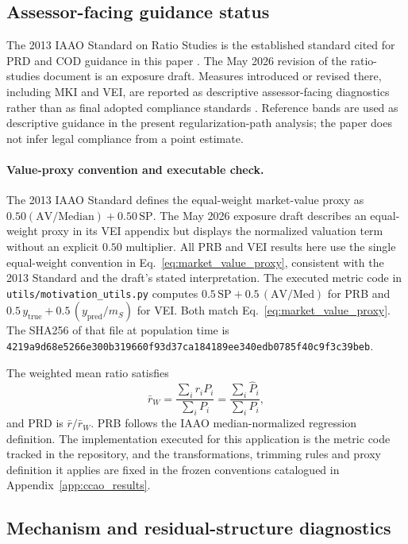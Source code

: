 \documentclass[10pt]{article}
\theoremstyle{definition}
\newcommand{\1}{\mathbf{1}}
\begin{document}
\subsection{Assessor-facing guidance status}

The 2013 IAAO Standard on Ratio Studies is the established standard cited for PRD
and COD guidance in this paper \cite{IAAO2013Ratio}. The May 2026 revision of the
ratio-studies document is an exposure draft. Measures introduced or revised there,
including MKI and VEI, are reported as descriptive assessor-facing diagnostics rather than as
final adopted compliance standards \cite{IAAO2026ExposureRatio}. Reference bands
are used as descriptive guidance in the present
regularization-path analysis; the paper does not
infer legal compliance from a point estimate.

\paragraph{Value-proxy convention and executable check.}
The 2013 IAAO Standard defines the equal-weight market-value proxy as
$0.50(\mathrm{AV}/\mathrm{Median})+0.50\,\mathrm{SP}$.
The May 2026 exposure draft describes an equal-weight proxy in its VEI
appendix but displays the normalized valuation term without an explicit
$0.50$ multiplier. All PRB and VEI results here use the single equal-weight
convention in Eq.~\eqref{eq:market_value_proxy}, consistent with the 2013
Standard and the draft's stated interpretation. The executed metric code in
\texttt{utils/motivation\_utils.py} computes
$0.5\,\mathrm{SP}+0.5\,(\mathrm{AV}/\mathrm{Med})$ for PRB and
$0.5\,y_{\mathrm{true}}+0.5\,(y_{\mathrm{pred}}/m_S)$ for VEI. Both match
Eq.~\eqref{eq:market_value_proxy}. The SHA256 of that file at population time
is \texttt{4219a9d68e5266e300b319660f93d37ca184189ee340edb0785f40c9f3c39beb}.

The weighted mean ratio satisfies
\[
\bar r_W
=
\frac{\sum_i r_iP_i}{\sum_iP_i}
=
\frac{\sum_i\widehat P_i}{\sum_iP_i},
\]
and PRD is $\bar r/\bar r_W$. PRB follows the IAAO median-normalized regression
definition. The implementation executed for this application is the metric code tracked in the
repository, and the transformations, trimming rules and proxy definition it applies are fixed in
the frozen conventions catalogued in Appendix~\ref{app:ccao_results}.

\subsection{Mechanism and residual-structure diagnostics}
\end{document}
